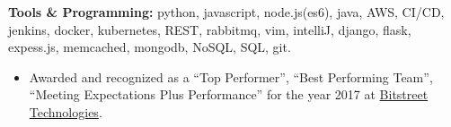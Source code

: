 \documentclass[11pt,a4paper]{article}
\newcommand{\quotes}[1]{``#1''}
\begin{document}
\spacedhrule{0.5em}{-0.4em}


\inlineheadedsection
{\textbf{Tools \& Programming:}}
python, javascript, node.js(es6), java, AWS, CI/CD, jenkins, docker, kubernetes, REST, rabbitmq, vim, intelliJ, django, flask, expess.js, memcached, mongodb, NoSQL, SQL, git.

%  

\spacedhrule{1.6em}{-0.4em}

{%
    \begin{itemize}
    \item Awarded and recognized as a \quotes{Top Performer}, \quotes{Best Performing Team}, \quotes{Meeting Expectations Plus Performance} for the year 2017 at {\href{http://bitstreet.in/}{Bitstreet Technologies}}.
    \end{itemize}
}
\end{document}
